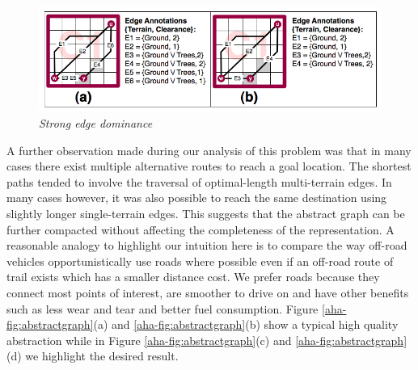 \begin{figure}[htbp]
	\vspace{-12pt}
        \caption{\emph{Strong edge dominance} }
        \begin{center}
                        \includegraphics[scale=0.3, trim = 20mm 7mm 20mm 5mm]{diagrams/intraedges_initial.png}
        \end{center}
        \label{aha-fig:strongdominance}
	\vspace{-6pt}
\end{figure}
A further observation made during our analysis of this problem was that in many cases there exist multiple alternative routes to reach a goal location.
The shortest paths tended to involve the traversal of optimal-length multi-terrain edges. In many cases however, it was also possible to reach the same destination using slightly longer single-terrain edges.
This suggests that the abstract graph can be further compacted without affecting the completeness of the representation.
A reasonable analogy to highlight our intuition here is to compare the way off-road vehicles opportunistically use roads where possible even if an off-road route of trail exists which has a smaller distance cost.
We prefer roads because they connect most points of interest, are smoother to drive on and have other benefits such as less wear and tear and better fuel consumption.
Figure \ref{aha-fig:abstractgraph}(a) and \ref{aha-fig:abstractgraph}(b) show a typical high quality abstraction while in Figure \ref{aha-fig:abstractgraph}(c) and \ref{aha-fig:abstractgraph}(d) we highlight the desired result. 
